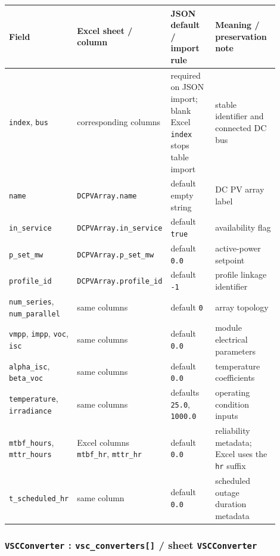 \begin{longtable}{L{0.20\linewidth}L{0.24\linewidth}L{0.20\linewidth}L{0.26\linewidth}}
\toprule
Field & Excel sheet / column & JSON default / import rule & Meaning / preservation note \\
\midrule
\endhead
\texttt{index}, \texttt{bus} & corresponding columns & required on JSON import; blank Excel \texttt{index} stops table import & stable identifier and connected DC bus \\
\texttt{name} & \texttt{DCPVArray.name} & default empty string & DC PV array label \\
\texttt{in\_service} & \texttt{DCPVArray.in\_service} & default \texttt{true} & availability flag \\
\texttt{p\_set\_mw} & \texttt{DCPVArray.p\_set\_mw} & default \texttt{0.0} & active-power setpoint \\
\texttt{profile\_id} & \texttt{DCPVArray.profile\_id} & default \texttt{-1} & profile linkage identifier \\
\texttt{num\_series}, \texttt{num\_parallel} & same columns & default \texttt{0} & array topology \\
\texttt{vmpp}, \texttt{impp}, \texttt{voc}, \texttt{isc} & same columns & default \texttt{0.0} & module electrical parameters \\
\texttt{alpha\_isc}, \texttt{beta\_voc} & same columns & default \texttt{0.0} & temperature coefficients \\
\texttt{temperature}, \texttt{irradiance} & same columns & defaults \texttt{25.0}, \texttt{1000.0} & operating condition inputs \\
\texttt{mtbf\_hours}, \texttt{mttr\_hours} & Excel columns \texttt{mtbf\_hr}, \texttt{mttr\_hr} & default \texttt{0.0} & reliability metadata; Excel uses the \texttt{hr} suffix \\
\texttt{t\_scheduled\_hr} & same column & default \texttt{0.0} & scheduled outage duration metadata \\
\bottomrule
\end{longtable}

\subsubsection*{\texttt{VSCConverter} : \texttt{vsc\_converters[]} / sheet \texttt{VSCConverter}}

